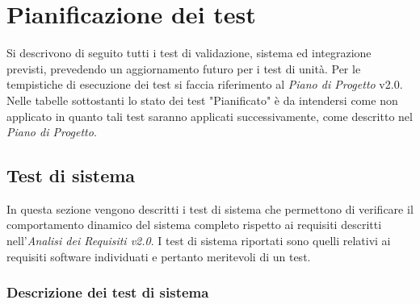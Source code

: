 \newcommand{\teststatus}{Pianificato}

\section {Pianificazione dei test}

Si descrivono di seguito tutti i test di validazione, sistema ed integrazione previsti, prevedendo un aggiornamento futuro per i test di unità. Per le tempistiche di esecuzione dei test si faccia riferimento al \textit{Piano di Progetto} v2.0. Nelle tabelle sottostanti lo stato dei test "Pianificato" è da intendersi come non applicato in quanto tali test saranno applicati successivamente, come descritto nel \textit{Piano di Progetto}.

\subsection {Test di sistema}

In questa sezione vengono descritti i test di sistema che permettono di verificare il comportamento dinamico del sistema completo rispetto ai requisiti descritti nell'\textit{Analisi dei Requisiti v2.0}.
I test di sistema riportati sono quelli relativi ai requisiti software individuati e pertanto meritevoli di un test.

\subsubsection{Descrizione dei test di sistema}

